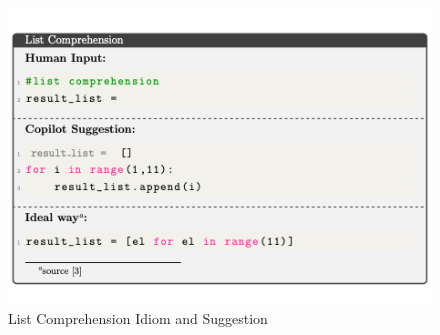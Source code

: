 \begin{figure}[hbt!]
    \centering
    \includegraphics[width=\linewidth]{Figures/idioms_1.png}
    \caption{List Comprehension Idiom and \cop{} Suggestion}
    \label{fig:idioms_1}
\end{figure}
